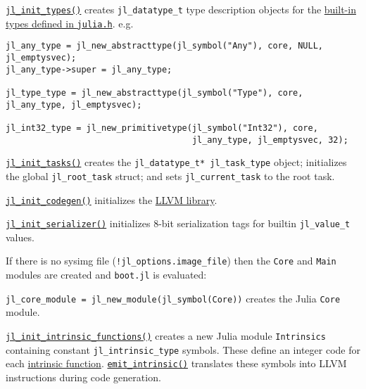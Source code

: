 \href{https://github.com/JuliaLang/julia/blob/master/src/jltypes.c}{\texttt{jl\_init\_types()}} creates \texttt{jl\_datatype\_t} type description objects for the \href{https://github.com/JuliaLang/julia/blob/master/src/julia.h}{built-in types defined in \texttt{julia.h}}. e.g.




\begin{lstlisting}
jl_any_type = jl_new_abstracttype(jl_symbol("Any"), core, NULL, jl_emptysvec);
jl_any_type->super = jl_any_type;

jl_type_type = jl_new_abstracttype(jl_symbol("Type"), core, jl_any_type, jl_emptysvec);

jl_int32_type = jl_new_primitivetype(jl_symbol("Int32"), core,
                                     jl_any_type, jl_emptysvec, 32);
\end{lstlisting}



\href{https://github.com/JuliaLang/julia/blob/master/src/task.c}{\texttt{jl\_init\_tasks()}} creates the \texttt{jl\_datatype\_t* jl\_task\_type} object; initializes the global \texttt{jl\_root\_task} struct; and sets \texttt{jl\_current\_task} to the root task.



\href{https://github.com/JuliaLang/julia/blob/master/src/codegen.cpp}{\texttt{jl\_init\_codegen()}} initializes the \href{http://llvm.org}{LLVM library}.



\href{https://github.com/JuliaLang/julia/blob/master/src/staticdata.c}{\texttt{jl\_init\_serializer()}} initializes 8-bit serialization tags for builtin \texttt{jl\_value\_t} values.



If there is no sysimg file (\texttt{!jl\_options.image\_file}) then the \texttt{Core} and \texttt{Main} modules are created and \texttt{boot.jl} is evaluated:



\texttt{jl\_core\_module = jl\_new\_module(jl\_symbol({\textquotedbl}Core{\textquotedbl}))} creates the Julia \texttt{Core} module.



\href{https://github.com/JuliaLang/julia/blob/master/src/intrinsics.cpp}{\texttt{jl\_init\_intrinsic\_functions()}} creates a new Julia module \texttt{Intrinsics} containing constant \texttt{jl\_intrinsic\_type} symbols. These define an integer code for each \href{https://github.com/JuliaLang/julia/blob/master/src/intrinsics.cpp}{intrinsic function}. \href{https://github.com/JuliaLang/julia/blob/master/src/intrinsics.cpp}{\texttt{emit\_intrinsic()}} translates these symbols into LLVM instructions during code generation.



